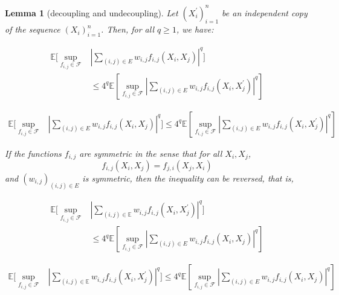\documentclass[letterpaper]{article} %
\def\DoubleColumn{}
\def\DoubleColumnEnd{}
\def\SingleColumn{}
\def\SingleColumnEnd{}
\newtheorem{lemma}{Lemma}
\newcommand{\E}{\mathbb{E}}
\newcommand{\pair}[1]{(#1)}
\begin{document}
\begin{lemma}[decoupling and undecoupling]
    \label{le:weighted_u_statistics_decoupling}
    Let $(X_i^\prime)_{i=1}^n$ be an independent copy of the sequence $(X_i)_{i=1}^n$. Then, for all $q\ge 1$, we have:
    \DoubleColumn
    \begin{equation}
        \begin{aligned}
        \label{eq:weighted_u_statistics_decoupling}
            \E[\sup_{f_{i,j}\in\mathcal{F}}&|\sum_{\pair{i,j}\in E}w_{i,j} f_{i,j}(X_i,X_j)|^q] \\
            &\le 4^q\E[\sup_{f_{i,j}\in\mathcal{F}}|\sum_{\pair{i,j}\in E} w_{i,j}f_{i,j}(X_i,X_j^\prime)|^q]
        \end{aligned}
    \end{equation}
    \DoubleColumnEnd
    \SingleColumn
    \begin{equation}
        \begin{aligned}
        \label{eq:weighted_u_statistics_decoupling}
            \E[\sup_{f_{i,j}\in\mathcal{F}}&|\sum_{\pair{i,j}\in E}w_{i,j} f_{i,j}(X_i,X_j)|^q] \le 4^q\E[\sup_{f_{i,j}\in\mathcal{F}}|\sum_{\pair{i,j}\in E} w_{i,j}f_{i,j}(X_i,X_j^\prime)|^q]
        \end{aligned}
    \end{equation}
    \SingleColumnEnd
    If the functions $f_{i,j}$ are symmetric in the sense that for all $X_i,X_j$,
    \[f_{i,j}(X_i,X_j)=f_{j,i}(X_j,X_i)\]
    and $(w_{i,j})_{\pair{i,j}\in E}$ is symmetric, then the inequality can be reversed, that is,
    \DoubleColumn
    \begin{equation}
        \begin{aligned}
        \label{eq:weighted_u_statistic_coupling}
        \E[\sup_{f_{i,j}\in\mathcal{F}}&|\sum_{\pair{i,j}\in\E}w_{i,j} f_{i,j}(X_i,X_j^\prime)|^q]\\
        &\le 4^q \E[\sup_{f_{i,j}\in\mathcal{F}}|\sum_{\pair{i,j}\in E}w_{i,j} f_{i,j}(X_i,X_j)|^q]
        \end{aligned}
    \end{equation}
    \DoubleColumnEnd
    \SingleColumn
    \begin{equation}
        \begin{aligned}
        \label{eq:weighted_u_statistic_coupling}
        \E[\sup_{f_{i,j}\in\mathcal{F}}&|\sum_{\pair{i,j}\in\E}w_{i,j} f_{i,j}(X_i,X_j^\prime)|^q] \le 4^q \E[\sup_{f_{i,j}\in\mathcal{F}}|\sum_{\pair{i,j}\in E}w_{i,j} f_{i,j}(X_i,X_j)|^q]
        \end{aligned}
    \end{equation}
    \SingleColumnEnd
\end{lemma}
\end{document}
